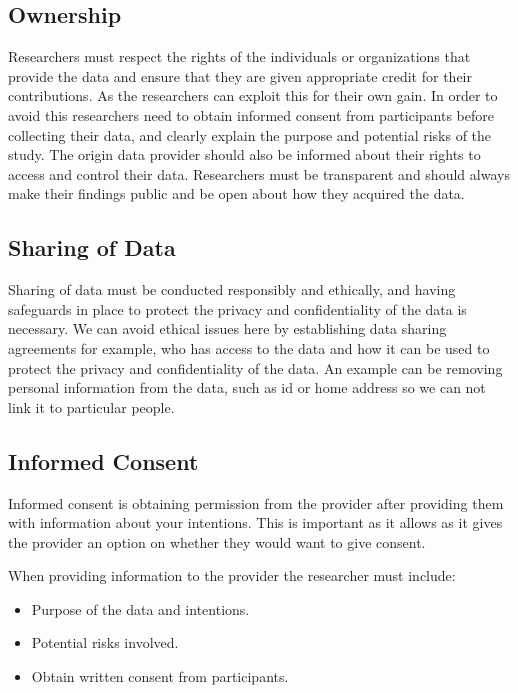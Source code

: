 \documentclass[]{final_report}
\begin{document}
\subsection{Ownership}

Researchers must respect the rights of the individuals or organizations that provide the data and ensure that they are given appropriate credit for their contributions. As the researchers can exploit this for their own gain. In order to avoid this researchers need to obtain informed consent from participants before collecting their data, and clearly explain the purpose and potential risks of the study. The origin data provider should also be informed about their rights to access and control their data. Researchers must be transparent and should always make their findings public and be open about how they acquired the data. 

\subsection{Sharing of Data}

Sharing of data must be conducted responsibly and ethically, and having safeguards in place to protect the privacy and confidentiality of the data is necessary. We can avoid ethical issues here by establishing data sharing agreements for example, who has access to the data and how it can be used to protect the privacy and confidentiality of the data. An example can be removing personal information from the data, such as id or home address so we can not link it to particular people.

\subsection{Informed Consent}

Informed consent is obtaining permission from the provider after providing them with information about your intentions. This is important as it allows as it gives the provider an option on whether they would want to give consent.

When providing information to the provider the researcher must include:

\begin{itemize}
    \item Purpose of the data and intentions.
    \item Potential risks involved.
    \item Obtain written consent from participants.
\end{itemize}
\end{document}

